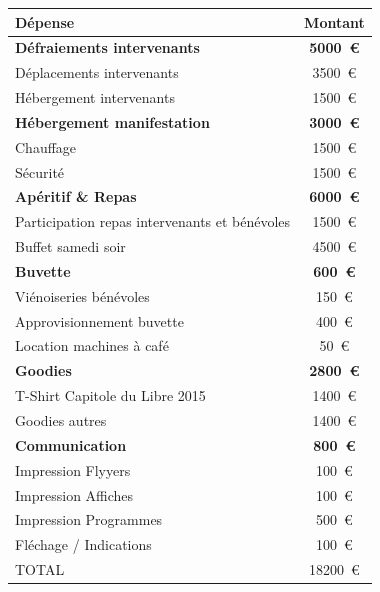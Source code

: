 \begin{center}
    \begin{tabular}{|l|c|}
        \hline Dépense & Montant \\
        \hline \textbf{Défraiements intervenants} & \textbf{\SI{5000}{\euro}} \\
        \hline Déplacements intervenants & \SI{3500}{\euro} \\
        \hline Hébergement intervenants & \SI{1500}{\euro} \\
        \hline \textbf{Hébergement manifestation} & \textbf{\SI{3000}{\euro}}\\
        \hline Chauffage & \SI{1500}{\euro} \\
        \hline Sécurité & \SI{1500}{\euro} \\
        \hline \textbf{Apéritif \& Repas} & \textbf{\SI{6000}{\euro}}\\
        \hline Participation repas intervenants et bénévoles & \SI{1500}{\euro} \\
        \hline Buffet samedi soir & \SI{4500}{\euro} \\
        \hline \textbf{Buvette} & \textbf{\SI{600}{\euro}}\\
        \hline Viénoiseries bénévoles & \SI{150}{\euro} \\
        \hline Approvisionnement buvette & \SI{400}{\euro} \\
        \hline Location machines à café & \SI{50}{\euro} \\
        \hline \textbf{Goodies} & \textbf{\SI{2800}{\euro} }\\
        \hline T-Shirt Capitole du Libre 2015 & \SI{1400}{\euro} \\
        \hline Goodies autres & \SI{1400}{\euro} \\
        \hline \textbf{Communication} & \textbf{\SI{800}{\euro}} \\
        \hline Impression Flyyers & \SI{100}{\euro} \\
        \hline Impression Affiches & \SI{100}{\euro} \\
        \hline Impression Programmes & \SI{500}{\euro} \\
        \hline Fléchage / Indications & \SI{100}{\euro} \\
        \hline
        \hline TOTAL & \SI{18200}{\euro} \\
        \hline
    \end{tabular}
\end{center}

